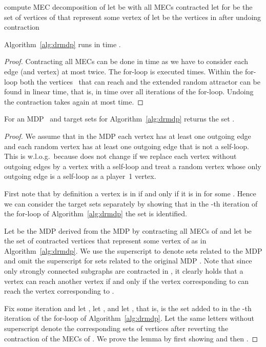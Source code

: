 \documentclass[11pt,letterpaper]{article}
\begin{document}
{\begin{algorithm}
{	}
	\BlankLine
	compute MEC decomposition of \;
	let  be  with all MECs contracted\;
	let  for  be the set
	of vertices of  that represent some vertex of \;
	\;
	\For{ \KwTo }{
		\;
		\;
		\;
	}
	let  be the vertices in  after undoing contraction\;
	\Return{}\;
\end{algorithm}

\begin{proposition}[Runtime]\label{prop:timedrmdp}
	Algorithm~\ref{alg:drmdp} runs in time .
\end{proposition}
\begin{proof}
	Contracting all MECs can be done in time  as we have to consider each 
	edge (and vertex) at most twice. The for-loop is executed  times.
	Within the for-loop both the vertices~ that can reach  and the 
	extended random attractor  can be found 
	in linear time, that is, in  time over all iterations of the for-loop.
	Undoing the contraction takes again at most  time.
\end{proof}

\begin{proposition}[Correctness]\label{prop:corrdrmdp}
For an MDP~ and target sets  
for  Algorithm~\ref{alg:drmdp} returns the set
.
\end{proposition}
\begin{proof}
We assume that in the MDP  each vertex 
has at least one outgoing edge and each random vertex has at least one outgoing 
edge that is not a self-loop. This is w.l.o.g.\ because  does not change if we replace each vertex without 
outgoing edges by a vertex with a self-loop and treat a random vertex whose
only outgoing edge is a self-loop as a player~1 vertex.

First note that by definition a vertex is in 
if and only if it is in  for some . 
Hence we can consider the  target
sets separately by showing that in the -th iteration of the for-loop of 
Algorithm~\ref{alg:drmdp} the set  is identified.

Let  be the MDP derived from the MDP  by contracting all
MECs of  and let  be the set of contracted vertices that 
represent some vertex of  as in Algorithm~\ref{alg:drmdp}.
We use the superscript  to denote sets related to the MDP  and 
omit the superscript for sets related to the original MDP .
 Note that since only strongly connected subgraphs are 
contracted in , it clearly holds that a vertex  can reach 
another vertex  if and only if the vertex  corresponding to  can reach the vertex  corresponding to .

Fix some iteration  and let 
, let , and let ,
that is,  is the set added to  in the -th iteration of the 
for-loop of Algorithm~\ref{alg:drmdp}. Let the same letters without superscript
denote the corresponding sets of vertices after reverting the contraction
of the MECs of .
We prove the lemma by first showing  and then .\smallskip


\end{proof}}
\end{document}
